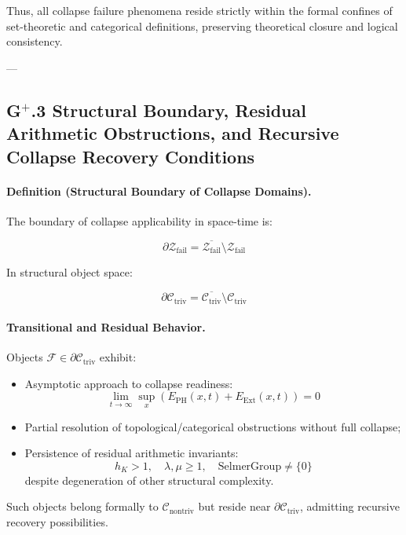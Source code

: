 \documentclass[11pt]{article}
\begin{document}
Thus, all collapse failure phenomena reside strictly within the formal confines of set-theoretic and categorical definitions, preserving theoretical closure and logical consistency.

---

\subsection*{G$^{+}$.3 Structural Boundary, Residual Arithmetic Obstructions, and Recursive Collapse Recovery Conditions}

\paragraph{Definition (Structural Boundary of Collapse Domains).}

The boundary of collapse applicability in space-time is:

\[
\partial \mathcal{Z}_{\mathrm{fail}} = \overline{\mathcal{Z}_{\mathrm{fail}}} \setminus \mathcal{Z}_{\mathrm{fail}}
\]

In structural object space:

\[
\partial \mathcal{C}_{\mathrm{triv}} = \overline{\mathcal{C}_{\mathrm{triv}}} \setminus \mathcal{C}_{\mathrm{triv}}
\]

\paragraph{Transitional and Residual Behavior.}

Objects $\mathcal{F} \in \partial \mathcal{C}_{\mathrm{triv}}$ exhibit:

\begin{itemize}
    \item Asymptotic approach to collapse readiness:
    \[
    \lim_{t \to \infty} \sup_{x} \left( E_{\mathrm{PH}}(x,t) + E_{\mathrm{Ext}}(x,t) \right) = 0
    \]
    \item Partial resolution of topological/categorical obstructions without full collapse;
    \item Persistence of residual arithmetic invariants:
    \[
    h_K > 1, \quad \lambda, \mu \geq 1, \quad \mathrm{SelmerGroup} \neq \{0\}
    \]
    despite degeneration of other structural complexity.
\end{itemize}

Such objects belong formally to $\mathcal{C}_{\mathrm{nontriv}}$ but reside near $\partial \mathcal{C}_{\mathrm{triv}}$, admitting recursive recovery possibilities.
\end{document}
